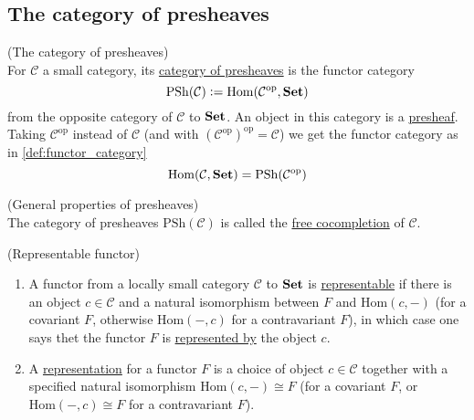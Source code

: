 
\subsection{The category of presheaves}

\begin{definition}{(The category of presheaves)}\\
For $\mathcal{C}$ a small category, its \ul{category of presheaves} is the functor category
\[ \mathrm{PSh}(\mathcal{C}) := \mathrm{Hom}(\mathcal{C}^{\text{op}}, \mathrm{\textbf{Set}}) \]
from the opposite category of $\mathcal{C}$ to $\mathrm{\textbf{Set}}$.
An object in this category is a \ul{presheaf}.\\
\noindent Taking $\mathcal{C}^{\text{op}}$ instead of $\mathcal{C}$ (and with $(\mathcal{C}^{\text{op}})^{\text{op}} = \mathcal{C}$)
we get the functor category as in \ref{def:functor_category}
\[
\mathrm{Hom}(\mathcal{C}, \mathrm{\textbf{Set}}) = \mathrm{PSh}(\mathcal{C}^{\text{op}})
\]
\end{definition}

\begin{remark}{(General properties of presheaves)}\\
The category of presheaves $\mathrm{PSh}(\mathcal{C})$ is called the \ul{free cocompletion} of $\mathcal{C}$.
\end{remark}

\begin{definition}{(Representable functor)}\label{def:repres_functor}
\begin{enumerate}
\renewcommand{\labelenumi}{(\theenumi)}
\item A functor from a locally small category $\mathcal{C}$ to $\mathrm{\textbf{Set}}$ is \ul{representable} if there is an object $c \in \mathcal{C}$ and a
natural isomorphism between $F$ and $\mathrm{Hom}(c,-)$ (for a covariant $F$, otherwise $\mathrm{Hom}(-,c)$ for a contravariant $F$),
in which case one says thet the functor $F$ is \ul{represented by} the object $c$.
\item A \ul{representation} for a functor $F$ is a choice of object $c \in \mathcal{C}$ together with a specified natural isomorphism
$\mathrm{Hom}(c,-) \cong F$ (for a covariant $F$, or $\mathrm{Hom}(-,c) \cong F$ for a contravariant $F$).
\end{enumerate}
\end{definition}

